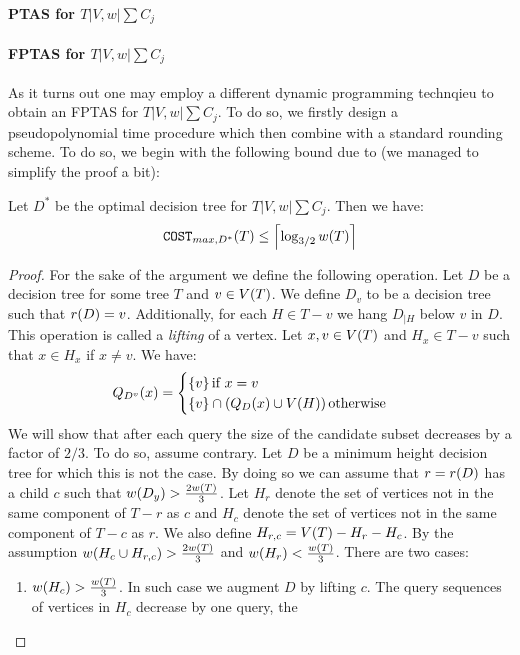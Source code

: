 \paragraph{PTAS for $T|V,w|\sum C_j$}
\paragraph{FPTAS for $T|V,w|\sum C_j$}
As it turns out one may employ a different dynamic programming technqieu to obtain an FPTAS for $T|V,w|\sum C_j$. To do so, we firstly design a pseudopolynomial time procedure which then combine with a standard rounding scheme. To do so, we begin with the following bound due to \cite{Fast_app_centroid_trees} (we managed to simplify the proof a bit):
\begin{theorem}
    Let $D^*$ be the optimal decision tree for $T|V,w|\sum C_j$. Then we have:
    $$\texttt{COST}_{max, D^*}\mathopen{}\left( T \right)\leq \mathopen{}\left\lceil \log_{3/2}w\mathopen{}\left( T \right) \right\rceil$$
    \begin{proof}
        For the sake of the argument we define the following operation. Let $D$ be a decision tree for some tree $T$ and $v\in V\mathopen{}\left( T \right)$. We define $D_v$ to be a decision tree such that $r\mathopen{}\left( D \right)=v$. Additionally, for each $H\in T-v$ we hang $D_{|H}$ below $v$ in $D$. This operation is called a \textit{lifting} of a vertex. Let $x,v\in V\mathopen{}\left( T \right)$ and $H_x\in T-v$ such that $x\in H_x$ if $x\neq v$. We have:
        $$
        Q_{D^v}\mathopen{}\left( x \right)=\begin{cases}
            \mathopen{}\left\{ v \right\} \text{if } x=v\\
            \mathopen{}\left\{ v \right\}\cap \mathopen{}\left( Q_{D}\mathopen{}\left( x \right)\cup V\mathopen{}\left( H \right) \right) \text{otherwise }
        \end{cases}
        $$
        We will show that after each query the size of the candidate subset decreases by a factor of $2/3$. To do so, assume contrary. Let $D$ be a minimum height decision tree for which this is not the case. By doing so we can assume that $r=r\mathopen{}\left( D \right)$ has a child $c$ such that $w\mathopen{}\left( D_y \right)> \frac{2w\mathopen{}\left( T \right)}{3}$. Let $H_r$ denote the set of vertices not in the same component of $T-r$ as $c$ and $H_c$ denote the set of vertices not in the same component of $T-c$ as $r$. We also define $H_{r, c}=V\mathopen{}\left( T \right)-H_r-H_c$. By the assumption $w\mathopen{}\left( H_c\cup H_{r, c} \right)>\frac{2w\mathopen{}\left( T \right)}{3}$ and $w\mathopen{}\left( H_r \right)<\frac{w\mathopen{}\left( T \right)}{3}$. There are two cases:
        \begin{enumerate}
            \item $w\mathopen{}\left( H_c \right)>\frac{w\mathopen{}\left( T \right)}{3}$. In such case we augment $D$ by lifting $c$. The query sequences of vertices in $H_c$ decrease by one query, the

\end{enumerate}
\end{proof}
\end{theorem}
